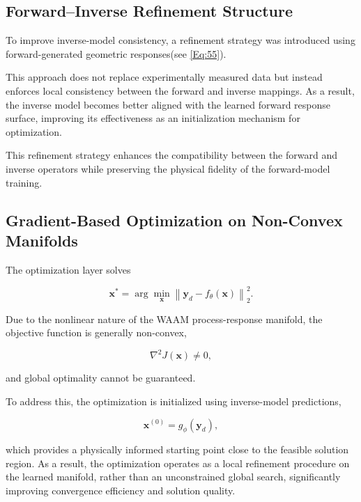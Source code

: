 \documentclass[11pt]{article}
\begin{document}
\subsection{Forward--Inverse Refinement Structure}

To improve inverse-model consistency, a refinement strategy was introduced using forward-generated geometric responses(see \ref{Eq:55}).


This approach does not replace experimentally measured data but instead enforces local consistency between the forward and inverse mappings. As a result, the inverse model becomes better aligned with the learned forward response surface, improving its effectiveness as an initialization mechanism for optimization.

This refinement strategy enhances the compatibility between the forward and inverse operators while preserving the physical fidelity of the forward-model training.

\subsection{Gradient-Based Optimization on Non-Convex Manifolds}

The optimization layer solves

\begin{equation}
\mathbf{x}^{*} =
\arg\min_{\mathbf{x}}
\left\|
\mathbf{y}_d - f_{\theta}(\mathbf{x})
\right\|_2^2.
\end{equation}

Due to the nonlinear nature of the WAAM process-response manifold, the objective function is generally non-convex,

\begin{equation}
\nabla^2 J(\mathbf{x}) \neq 0,
\end{equation}

and global optimality cannot be guaranteed. 

To address this, the optimization is initialized using inverse-model predictions,

\begin{equation}
\mathbf{x}^{(0)} = g_{\phi}(\mathbf{y}_d),
\end{equation}

which provides a physically informed starting point close to the feasible solution region. As a result, the optimization operates as a local refinement procedure on the learned manifold, rather than an unconstrained global search, significantly improving convergence efficiency and solution quality.
\end{document}
